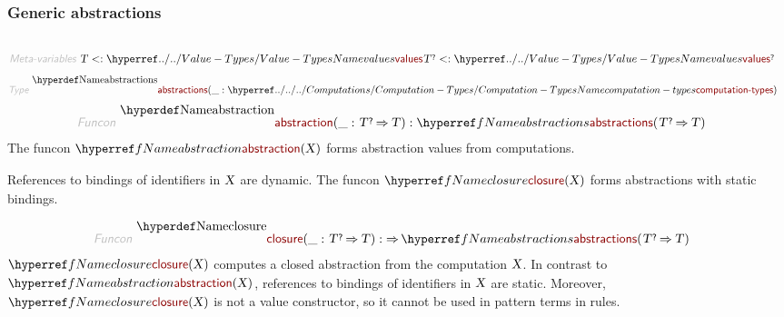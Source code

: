 \subsubsection*{Generic abstractions}\hypertarget{generic-abstractions}{}\label{generic-abstractions}

\begin{align*}
  [ ~ 
  \KEY{Type} ~ & \NAMEREF{abstractions} \\
  \KEY{Funcon} ~ & \NAMEREF{abstraction} \\
  \KEY{Funcon} ~ & \NAMEREF{closure} \\
  \KEY{Funcon} ~ & \NAMEREF{enact}
  ~ ]
\end{align*}
\begin{align*}
  \KEY{Meta-variables} ~ 
  & \VAR{T} <: \NAMEHYPER{../..}{Value-Types}{values} \VAR{T}\QUERY <: \NAMEHYPER{../..}{Value-Types}{values}\QUERY
\end{align*}
\begin{align*}
  \KEY{Type} ~  
  & \NAMEDECL{abstractions}(\_ : \NAMEHYPER{../../../Computations}{Computation-Types}{computation-types}) 
\end{align*}
\begin{align*}
  \KEY{Funcon} ~ 
  & \NAMEDECL{abstraction}(\_ : \VAR{T}\QUERY \TO \VAR{T}) : \NAMEREF{abstractions}
                                                            ( \VAR{T}\QUERY \TO \VAR{T} )
\end{align*}
The funcon $\SHADE{\NAMEREF{abstraction}
           ( \VAR{X} )}$ forms abstraction values from computations.

References to bindings of identifiers in $\SHADE{\VAR{X}}$ are dynamic.
  The funcon $\SHADE{\NAMEREF{closure}
           ( \VAR{X} )}$ forms abstractions with static bindings.

\begin{align*}
  \KEY{Funcon} ~ 
  & \NAMEDECL{closure}(\_ : \VAR{T}\QUERY \TO \VAR{T}) :  \TO \NAMEREF{abstractions}
                                                                         ( \VAR{T}\QUERY \TO \VAR{T} )
\end{align*}
$\SHADE{\NAMEREF{closure}
           ( \VAR{X} )}$ computes a closed abstraction from the computation $\SHADE{\VAR{X}}$.
  In contrast to $\SHADE{\NAMEREF{abstraction}
           ( \VAR{X} )}$, references to bindings of identifiers
  in $\SHADE{\VAR{X}}$ are static. Moreover, $\SHADE{\NAMEREF{closure}
           ( \VAR{X} )}$ is not a value constructor,
  so it cannot be used in pattern terms in rules.

